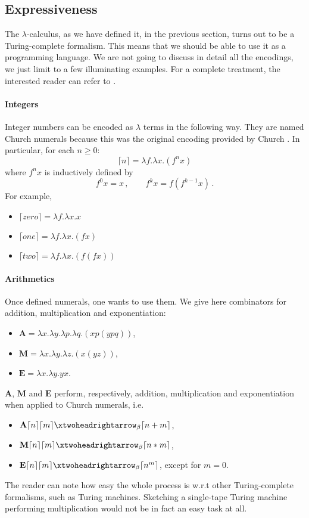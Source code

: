 \subsection{Expressiveness}
The $\lambda$-calculus, as we have defined it, in the previous section, turns out to be a Turing-complete formalism. This means that we should be able to use it as a programming language. We are not going to discuss in detail all the encodings, we just limit to a few illuminating examples. For a complete treatment, the interested reader can refer to \cite{barendregt_lambda_1984}.
\paragraph{Integers}
Integer numbers can be encoded as $\lambda$ terms in the following way. They are named Church numerals because this was the original encoding provided by Church \cite{}. In particular, for each $n\geq 0$:
$$
\lceil n\rceil=\lambda f.\lambda x.(f^nx)
$$
where $f^nx$ is inductively defined by
$$
f^0x=x\,,\qquad f^kx=f(f^{k-1}x)\,.
$$
For example,
\begin{itemize}
	\item $\lceil zero\rceil=\lambda f.\lambda x.x$
	\item $\lceil one\rceil=\lambda f.\lambda x.(fx)$
	\item $\lceil two\rceil=\lambda f.\lambda x.(f(fx))$
\end{itemize}
\paragraph{Arithmetics}
Once defined numerals, one wants to use them. We give here combinators for addition, multiplication and exponentiation:
\begin{itemize}
	\item $\mathbf{A}=\lambda x.\lambda y.\lambda p.\lambda q.(xp(ypq))$,
	\item $\mathbf{M}=\lambda x.\lambda y.\lambda z.(x(yz))$,
	\item $\mathbf{E}=\lambda x.\lambda y.yx$.
\end{itemize}
\begin{proposition}
	$\mathbf{A}$, $\mathbf{M}$ and $\mathbf{E}$ perform, respectively, addition, multiplication and exponentiation when applied to Church numerals, i.e.
	\begin{itemize}
		\item $\mathbf{A}\lceil n\rceil\lceil m\rceil\redbetared{}\lceil n+m\rceil$,
		\item $\mathbf{M}\lceil n\rceil\lceil m\rceil\redbetared{}\lceil n*m\rceil$,
		\item $\mathbf{E}\lceil n\rceil\lceil m\rceil\redbetared{}\lceil n^m\rceil$, except for $m=0$.
	\end{itemize}
\end{proposition}
The reader can note how easy the whole process is w.r.t other Turing-complete formalisms, such as Turing machines. Sketching a single-tape Turing machine performing multiplication would not be in fact an easy task at all.
